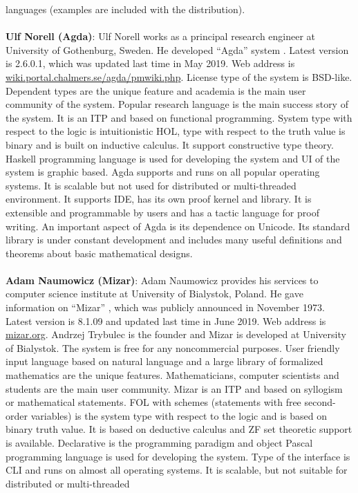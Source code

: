 languages (examples are included with the distribution). 
\\\\
{\bf Ulf Norell (Agda)}:
Ulf Norell works as a principal research engineer at University of Gothenburg, Sweden. He developed ``Agda'' system . 
Latest version is  2.6.0.1, which was updated last time in May 2019. Web address is \url{wiki.portal.chalmers.se/agda/pmwiki.php}.  
License type of the system is BSD-like. Dependent types are the unique feature and academia is the main user community of the system. 
Popular research language is the main success story of the system.  It is an ITP and based on functional programming. System type  with respect 
to the logic is intuitionistic HOL, type with respect to the truth value is binary and is built on inductive calculus. 
It support constructive type theory. Haskell programming language is used for developing the system and UI of the system is graphic 
based. Agda supports and runs on all popular operating systems. It is scalable but not used for distributed or multi-threaded environment. 
It supports IDE, has its own proof kernel and library. It is extensible and programmable by users and has a tactic language for proof writing.
An important aspect of Agda is its dependence on Unicode. Its standard library is under constant development and 
includes many useful definitions and theorems about basic mathematical designs.
\\\\
{\bf Adam Naumowicz (Mizar)}: 
Adam Naumowicz provides his services to computer science institute at University of Bialystok, Poland. He gave information on ``Mizar'' 
, 
which was publicly announced in November 1973. Latest version is 8.1.09 and updated last time in June 2019. 
Web address is \url{mizar.org}. Andrzej Trybulec is the founder and Mizar is developed at University of Bialystok. The system is free 
for any noncommercial purposes. User friendly input language based on natural language and a large library of formalized mathematics are 
the unique features. Mathematicians, computer scientists and students are the main user community. Mizar is an ITP  
and based on syllogism or mathematical statements. FOL with schemes (statements with free second-order variables) is the system type with respect 
to the logic and is based on binary truth value. It is based on deductive calculus and ZF set theoretic support is available. 
Declarative is the programming paradigm and object Pascal programming language is used for developing the system. Type of the 
interface is CLI and runs on almost all operating systems. It is scalable, but not suitable for distributed or multi-threaded 
